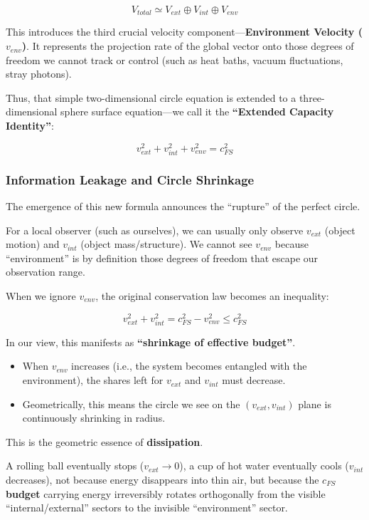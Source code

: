 \[V_{total} \simeq V_{ext} \oplus V_{int} \oplus V_{env}\]

This introduces the third crucial velocity component---\textbf{Environment Velocity ($v_{env}$)}. It represents the projection rate of the global vector onto those degrees of freedom we cannot track or control (such as heat baths, vacuum fluctuations, stray photons).

Thus, that simple two-dimensional circle equation is extended to a three-dimensional sphere surface equation---we call it the \textbf{``Extended Capacity Identity''}:

\[v_{ext}^2 + v_{int}^2 + v_{env}^2 = c_{FS}^2\]

\subsubsection{Information Leakage and Circle Shrinkage}

The emergence of this new formula announces the ``rupture'' of the perfect circle.

For a local observer (such as ourselves), we can usually only observe $v_{ext}$ (object motion) and $v_{int}$ (object mass/structure). We cannot see $v_{env}$ because ``environment'' is by definition those degrees of freedom that escape our observation range.

When we ignore $v_{env}$, the original conservation law becomes an inequality:

\[v_{ext}^2 + v_{int}^2 = c_{FS}^2 - v_{env}^2 \le c_{FS}^2\]

In our view, this manifests as \textbf{``shrinkage of effective budget''}.

\begin{itemize}
\item When $v_{env}$ increases (i.e., the system becomes entangled with the environment), the shares left for $v_{ext}$ and $v_{int}$ must decrease.

\item Geometrically, this means the circle we see on the $(v_{ext}, v_{int})$ plane is continuously shrinking in radius.
\end{itemize}

This is the geometric essence of \textbf{dissipation}.

A rolling ball eventually stops ($v_{ext} \to 0$), a cup of hot water eventually cools ($v_{int}$ decreases), not because energy disappears into thin air, but because the \textbf{$c_{FS}$ budget} carrying energy irreversibly rotates orthogonally from the visible ``internal/external'' sectors to the invisible ``environment'' sector.


